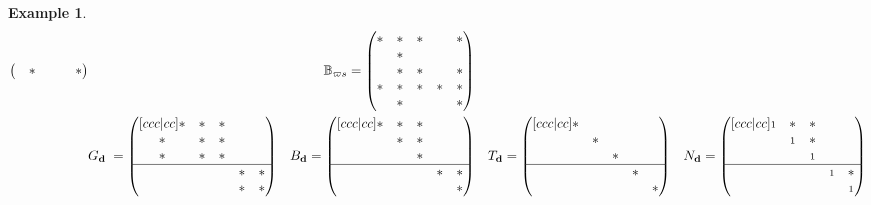 \documentclass[reqno,11pt]{book}
\numberwithin{equation}{section}
\theoremstyle{plain}
\newtheorem{eg}[theorem]{Example}
\theoremstyle{plain}
\numberwithin{equation}{section}
\theoremstyle{remark}
\newcommand{\dimvec}[1]{\mathbf{#1}}
\newcommand{\absgp}[1]{\mathbb{#1}}
\newcommand{\ww}{\varpi}
\begin{document}
\begin{eg}
\begin{equation*}
\begin{aligned}
\begin{pmatrix}
   & * &  &  & * \\
  \end{pmatrix}&&
  \absgp{B}_{\ww s}=
     \begin{pmatrix}
    * & * & *  &  & * \\
     & * &  &  &  \\
     & * & * &  & * \\
    * & * & * & * & * \\
     & * &  &  & * \\
    \end{pmatrix}&&
  \\
  &G_{\dimvec{d}}\;=
  \begin{pmatrix}[ccc|cc]
  * & * & * &  &  \\
  * & * & * &  &  \\
  * & * & * &  &  \\
     \hline
   &  &  & * & * \\ 
   &  &  & * & * \\ 
  \end{pmatrix}&
  B_{\dimvec{d}}=
    \begin{pmatrix}[ccc|cc]
    * & * & * &  &  \\
     & * & * &  &  \\
     &  & * &  &  \\
        \hline
     &  &  & * & * \\ 
     &  &  &  & * \\ 
    \end{pmatrix}&&
  T_{\dimvec{d}}=
    \begin{pmatrix}[ccc|cc]
     * &  &  &  &  \\
       & * &  &  &  \\
       &  & * &  &  \\
          \hline
       &  &  & * &  \\
       &  &  &  & * \\
    \end{pmatrix}&&
  N_{\dimvec{d}}=
         \begin{pmatrix}[ccc|cc]
          \scriptstyle 1 & * & * &  &  \\
           & \scriptstyle 1 & * &  &  \\
           &  & \scriptstyle 1 &  &  \\
              \hline
           &  &  & \scriptstyle 1 & * \\ 
           &  &  &  & \scriptstyle 1 \\ 
          \end{pmatrix}  

\end{aligned}
\end{equation*}
\end{eg}
\end{document}
